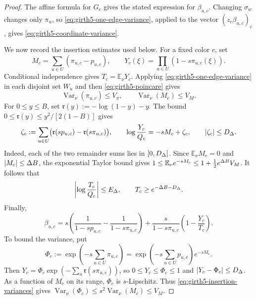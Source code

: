 \begin{proof}
The affine formula for $G_c$ gives the stated expression for $\beta_{u,c}$.
Changing $\sigma_w$ changes only $\pi_u$, so \eqref{eq:girth5-one-edge-variance}, applied to the vector
$(z_c\beta_{u,c})_c$, gives \eqref{eq:girth5-coordinate-variance}.

We now record the insertion estimates used below.  For a fixed color $c$, set
\begin{equation}\label{eq:girth5-insertion-variables}
 M_c=\sum_{u\in U}(\pi_{u,c}-p_{u,c}),\qquad
 Y_c(\xi)=\prod_{u\in U}(1-s\pi_{u,c}(\xi)).
\end{equation}
Conditional independence gives $T_c=\mathbb E_\nu Y_c$.  Applying
\eqref{eq:girth5-one-edge-variance} in each disjoint set $W_u$ and then \eqref{eq:girth5-poincare} gives
\begin{equation}\label{eq:girth5-insertion-variances}
 \operatorname{Var}_\nu(\pi_{u,c})\le V_\pi,\qquad
 \operatorname{Var}_\nu(M_c)\le V_M.
\end{equation}
For $0\le y\le B$, set $\mathfrak r(y):=-\log(1-y)-y$.
The bound $0\le\mathfrak r(y)\le y^2/[2(1-B)]$ gives
\begin{equation}\label{eq:girth5-log-remainder}
 \zeta_c:=\sum_{u\in U}
   \bigl(\mathfrak r(sp_{u,c})-\mathfrak r(s\pi_{u,c})\bigr),
 \qquad
 \log\frac{Y_c}{Q_c}=-sM_c+\zeta_c,
 \qquad |\zeta_c|\le D_\Delta.
\end{equation}
Indeed, each of the two remainder sums lies in $[0,D_\Delta]$.
Since $\mathbb E_\nu M_c=0$ and $|M_c|\le\Delta B$, the exponential
Taylor bound gives
$1\le\mathbb E_\nu e^{-sM_c}\le
1+\tfrac12e^{\Delta B}V_M$.  It follows that
\begin{equation}\label{eq:girth5-insertion-quotient}
 \left|\log\frac{T_c}{Q_c}\right|\le E_\Delta,\qquad
 T_c\ge e^{-\Delta B-D_\Delta}.
\end{equation}
Finally,
\begin{equation}\label{eq:girth5-beta-decomposition}
 \beta_{u,c}=s\left(\frac1{1-sp_{u,c}}-\frac1{1-s\pi_{u,c}}\right)
 +\frac{s}{1-s\pi_{u,c}}\left(1-\frac{Y_c}{T_c}\right).
\end{equation}
To bound the variance, put
\[
 \Phi_c:=\exp\!\left(-s\sum_{u\in U}\pi_{u,c}\right)
 =\exp\!\left(-s\sum_{u\in U}p_{u,c}\right)e^{-sM_c}.
\]
Then $Y_c=\Phi_c\exp(-\sum_u\mathfrak r(s\pi_{u,c}))$, so
$0\le Y_c\le\Phi_c\le1$ and $|Y_c-\Phi_c|\le D_\Delta$.
As a function of $M_c$ on its range, $\Phi_c$ is $s$-Lipschitz.
Thus \eqref{eq:girth5-insertion-variances} gives
$\operatorname{Var}_\nu(\Phi_c)\le s^2\operatorname{Var}_\nu(M_c)\le V_M$.

\end{proof}
